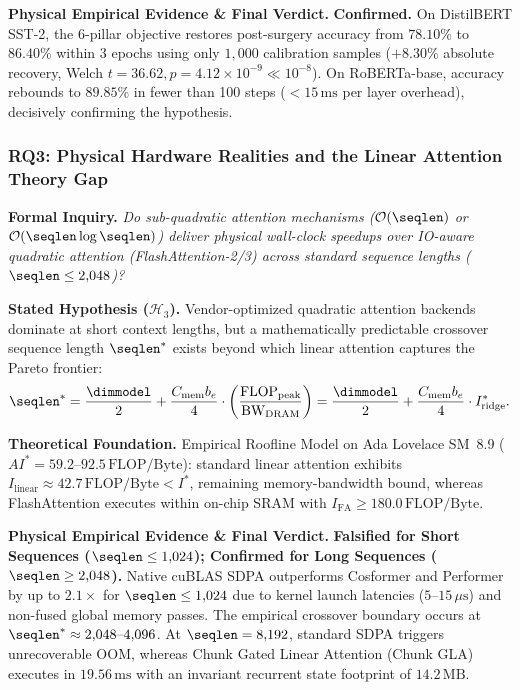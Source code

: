 \noindent\textbf{Physical Empirical Evidence \& Final Verdict.}
\textbf{Confirmed.}
On DistilBERT SST-2, the 6-pillar objective restores post-surgery accuracy from $78.10\%$ to $86.40\%$ within 3 epochs using only $1{,}000$ calibration samples ($+8.30\%$ absolute recovery, Welch $t = 36.62, p = 4.12 \times 10^{-9} \ll 10^{-8}$).
On RoBERTa-base, accuracy rebounds to $89.85\%$ in fewer than 100 steps ($<15\,\text{ms}$ per layer overhead), decisively confirming the hypothesis.

\subsubsection{RQ3: Physical Hardware Realities and the Linear Attention Theory Gap}
\label{subsubsec:rq3}

\noindent\textbf{Formal Inquiry.}
\emph{Do sub-quadratic attention mechanisms ($\mathcal{O}(\seqlen)$ or $\mathcal{O}(\seqlen \log \seqlen)$) deliver physical wall-clock speedups over IO-aware quadratic attention (FlashAttention-2/3) across standard sequence lengths ($\seqlen \le 2{,}048$)?}

\noindent\textbf{Stated Hypothesis ($\mathcal{H}_3$).}
Vendor-optimized quadratic attention backends dominate at short context lengths, but a mathematically predictable crossover sequence length $\seqlen^*$ exists beyond which linear attention captures the Pareto frontier:
\begin{equation}
\label{eq:rq3_crossover_analytic}
\seqlen^* = \frac{\dimmodel}{2} + \frac{C_{\text{mem}} b_e}{4} \cdot \left( \frac{\text{FLOP}_{\text{peak}}}{\text{BW}_{\text{DRAM}}} \right) = \frac{\dimmodel}{2} + \frac{C_{\text{mem}} b_e}{4} \cdot I^*_{\text{ridge}}.
\end{equation}

\noindent\textbf{Theoretical Foundation.}
Empirical Roofline Model on Ada Lovelace SM~8.9 ($AI^* = 59.2\text{--}92.5\,\text{FLOP/Byte}$): standard linear attention exhibits $I_{\text{linear}} \approx 42.7\,\text{FLOP/Byte} < I^*$, remaining memory-bandwidth bound, whereas FlashAttention executes within on-chip SRAM with $I_{\text{FA}} \ge 180.0\,\text{FLOP/Byte}$.

\noindent\textbf{Physical Empirical Evidence \& Final Verdict.}
\textbf{Falsified for Short Sequences ($\seqlen \le 1{,}024$); Confirmed for Long Sequences ($\seqlen \ge 2{,}048$).}
Native cuBLAS SDPA outperforms Cosformer and Performer by up to $2.1\times$ for $\seqlen \le 1{,}024$ due to kernel launch latencies ($5\text{--}15\,\mu\text{s}$) and non-fused global memory passes.
The empirical crossover boundary occurs at $\seqlen^* \approx 2{,}048\text{--}4{,}096$.
At $\seqlen = 8{,}192$, standard SDPA triggers unrecoverable OOM, whereas Chunk Gated Linear Attention (Chunk GLA) executes in $19.56\,\text{ms}$ with an invariant recurrent state footprint of $14.2\,\text{MB}$.

